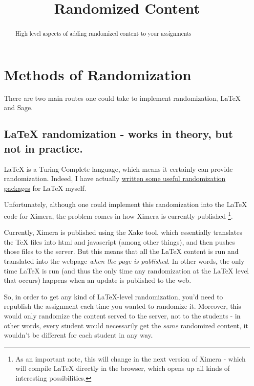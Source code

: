 \documentclass{ximera}
\title{Randomized Content}
\begin{document}
\begin{abstract}
    High level aspects of adding randomized content to your assignments
\end{abstract}
\maketitle

\section*{Methods of Randomization}
    There are two main routes one could take to implement randomization, LaTeX and Sage. 
    
    \subsection*{LaTeX randomization - works in theory, but not in practice.}
        \LaTeX{} is a Turing-Complete language, which means it certainly can provide randomization. Indeed, I have actually \href{https://github.com/xronosuf/Ximera-Latex-Package/blob/master/OptionalPackages/randomize.sty}{written some useful randomization packages} for LaTeX myself.
        
        Unfortunately, although one could implement this randomization into the LaTeX code for Ximera, the problem comes in how Ximera is currently published%
        \footnote{As an important note, this will change in the next version of Ximera - which will compile LaTeX directly in the browser, which opens up all kinds of interesting possibilities.}.
        
        Currently, Ximera is published using the Xake tool, which essentially translates the TeX files into html and javascript (among other things), and then pushes those files to the server. But this means that all the LaTeX content is run and translated into the webpage \textit{when the page is published}. In other words, the only time LaTeX is run (and thus the only time any randomization at the LaTeX level that occurs) happens when an update is published to the web.
        
        So, in order to get any kind of LaTeX-level randomization, you'd need to republish the assignment each time you wanted to randomize it. Moreover, this would only randomize the content served to the server, not to the students - in other words, every student would necessarily get the \textit{same} randomized content, it wouldn't be different for each student in any way.
        
\end{document}

